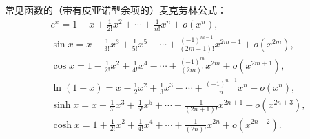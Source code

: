常见函数的（带有皮亚诺型余项的）麦克劳林公式：
\begin{gather*}
	e^x = 1 + x + \frac{1}{2!} x^2 + \dotsb + \frac{1}{n!} x^n + o(x^n), \\
	\sin x = x - \frac{1}{3!} x^3 + \frac{1}{5!} x^5 - \dotsb + \frac{(-1)^{m-1}}{(2m-1)!} x^{2m-1} + o(x^{2m}), \\
	\cos x = 1 - \frac{1}{2!} x^2 + \frac{1}{4!} x^4 - \dotsb + \frac{(-1)^m}{(2m)!} x^{2m} + o(x^{2m+1}), \\
	\ln(1+x) = x - \frac{1}{2} x^2 + \frac{1}{3} x^3 - \dotsb + \frac{(-1)^{n-1}}{n} x^n + o(x^n), \\
	\sinh x = x + \frac{1}{3!} x^3 + \frac{1}{5!} x^5 + \dotsb + \frac{1}{(2n+1)!} x^{2n+1} + o(x^{2n+3}), \\
	\cosh x = 1 + \frac{1}{2!} x^2 + \frac{1}{4!} x^4 + \dotsb + \frac{1}{(2n)!} x^{2n} + o(x^{2n+2}).
\end{gather*}
